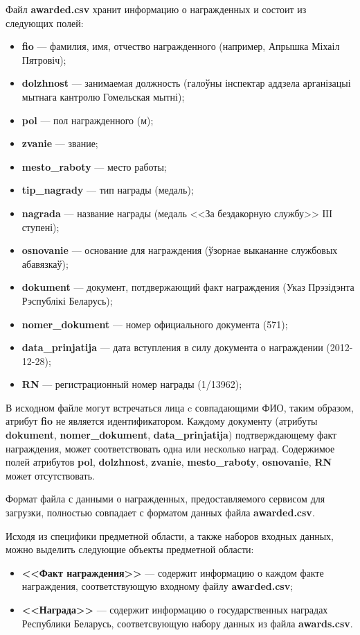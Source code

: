 Файл \textbf{awarded.csv} хранит информацию о награжденных и состоит из следующих полей:
\begin{itemize}
\item
  \textbf{fio} --- фамилия, имя, отчество награжденного
  (например, Апрышка Міхаіл Пятровіч);
\item
  \textbf{dolzhnost} --- занимаемая должность
  (галоўны інспектар аддзела арганізацыі мытнага кантролю Гомельская мытні);
\item
  \textbf{pol} --- пол награжденного
  (м);
\item
  \textbf{zvanie} --- звание;
\item
  \textbf{mesto\_raboty} --- место работы;
\item 
  \textbf{tip\_nagrady} --- тип награды
  (медаль);
\item
  \textbf{nagrada} --- название награды
  (медаль <<За бездакорную службу>> ІIІ ступені);
\item
  \textbf{osnovanie} --- основание для награждения
  (ўзорнае выкананне службовых абавязкаў);
\item
  \textbf{dokument} --- документ, потдвержающий факт награждения
  (Указ Прэзідэнта Рэспублікі Беларусь);
\item
  \textbf{nomer\_dokument} --- номер официального документа
  (571);
\item
  \textbf{data\_prinjatija} --- дата вступления в силу документа о награждении
  (2012-12-28);
\item
  \textbf{RN} --- регистрационный номер награды
  (1/13962);
\end{itemize}

В исходном файле могут встречаться лица c совпадающими ФИО,
таким образом, атрибут \textbf{fio} не является идентификатором.
Каждому документу (атрибуты \textbf{dokument}, \textbf{nomer\_dokument},
\textbf{data\_prinjatija})
подтверждающему факт награждения, может соответствовать одна или несколько наград.
Содержимое полей атрибутов \textbf{pol}, \textbf{dolzhnost}, \textbf{zvanie}, 
\textbf{mesto\_raboty}, \textbf{osnovanie}, \textbf{RN} может отсутствовать.

Формат файла с данными о награжденных, предоставляемого сервисом для загрузки,
полностью совпадает с форматом данных файла \textbf{awarded.csv}.

Исходя из специфики предметной области, а также наборов входных данных, можно выделить
следующие объекты предметной области:

\begin{itemize}
  \item \textbf{<<Факт награждения>>} --- содержит информацию о каждом факте награждения,
    соответствующую входному файлу \textbf{awarded.csv};
  \item \textbf{<<Награда>>} --- содержит информацию о государственных наградах
    Республики Беларусь, соответсвующую набору данных из файла \textbf{awards.csv}.
\end{itemize}

